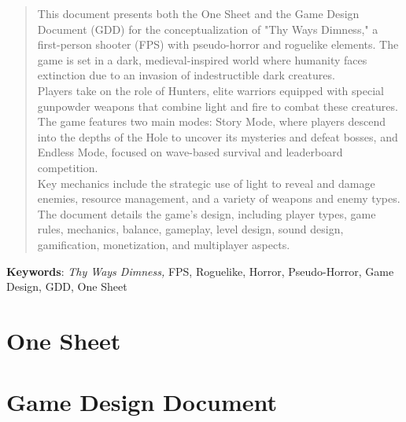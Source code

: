 \documentclass[12pt]{article}
\begin{document}
\begin{abstract}
    This document presents both the One Sheet and the Game Design Document (GDD) for the conceptualization of "Thy Ways Dimness," a first-person shooter (FPS) with pseudo-horror and roguelike elements. The game is set in a dark, medieval-inspired world where humanity faces extinction due to an invasion of indestructible dark creatures.\\

    Players take on the role of Hunters, elite warriors equipped with special gunpowder weapons that combine light and fire to combat these creatures. The game features two main modes: Story Mode, where players descend into the depths of the Hole to uncover its mysteries and defeat bosses, and Endless Mode, focused on wave-based survival and leaderboard competition.\\

    Key mechanics include the strategic use of light to reveal and damage enemies, resource management, and a variety of weapons and enemy types. The document details the game's design, including player types, game rules, mechanics, balance, gameplay, level design, sound design, gamification, monetization, and multiplayer aspects.
\end{abstract}
{\small \textbf{Keywords}: \textit{Thy Ways Dimness,} FPS, Roguelike, Horror, Pseudo-Horror, Game Design, GDD, One Sheet}
\newpage
{}

\hypertarget{toc}{}

\tableofcontents

\newpage

\listoftables
\newpage

\newpage


\part{One Sheet}

\newpage

\part{Game Design Document}


\newpage
\printbibliography %
\end{document}
